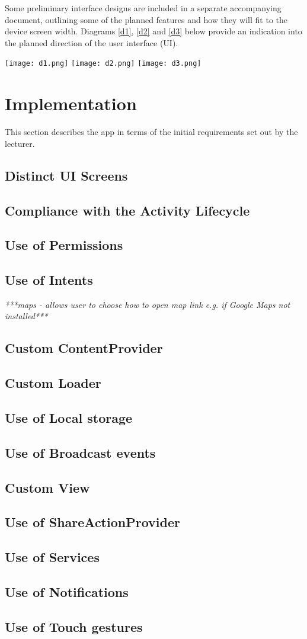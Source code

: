 \documentclass{article}
\begin{document}
Some preliminary interface designs are included in a separate accompanying document, outlining some of the planned features and how they will fit to the device screen width. Diagrams \ref{d1}, \ref{d2} and \ref{d3} below provide an indication into the planned direction of the user interface (UI).

\texttt{[image: d1.png]}
\texttt{[image: d2.png]}
\texttt{[image: d3.png]}

\section{Implementation}
This section describes the app in terms of the initial requirements set out by the lecturer.

\subsection{Distinct UI Screens}
\subsection{Compliance with the Activity Lifecycle}
\subsection{Use of Permissions}
\subsection{Use of Intents}
\emph{***maps - allows user to choose how to open map link e.g. if Google Maps not installed***}
\subsection{Custom ContentProvider}
\subsection{Custom Loader}
\subsection{Use of Local storage}
\subsection{Use of Broadcast events}
\subsection{Custom View}
\subsection{Use of ShareActionProvider}
\subsection{Use of Services}
\subsection{Use of Notifications}
\subsection{Use of Touch gestures}
\end{document}
